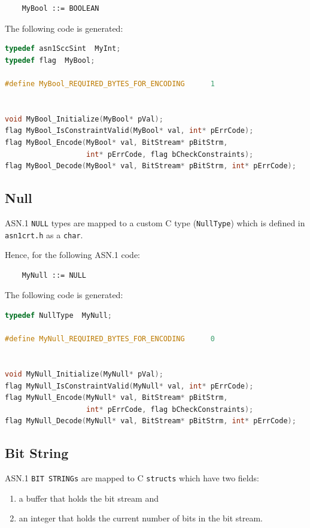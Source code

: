 \documentclass[11pt]{book}
\begin{document}
\begin{lstlisting}
	MyBool ::= BOOLEAN
\end{lstlisting}


      The following code is generated:

\begin{lstlisting}[language=c]
typedef asn1SccSint  MyInt;
typedef flag  MyBool;

#define MyBool_REQUIRED_BYTES_FOR_ENCODING		1


void MyBool_Initialize(MyBool* pVal);
flag MyBool_IsConstraintValid(MyBool* val, int* pErrCode);
flag MyBool_Encode(MyBool* val, BitStream* pBitStrm, 
                   int* pErrCode, flag bCheckConstraints);
flag MyBool_Decode(MyBool* val, BitStream* pBitStrm, int* pErrCode);
\end{lstlisting}


      \subsection{Null}
      ASN.1 \texttt{NULL} types are mapped to a custom C type (\texttt{NullType}) which is defined in 
      \texttt{asn1crt.h} as a \texttt{char}.

      Hence, for the following ASN.1 code:

\begin{lstlisting}
	MyNull ::= NULL
\end{lstlisting}

      The following code is generated:

\begin{lstlisting}[language=c]
typedef NullType  MyNull;

#define MyNull_REQUIRED_BYTES_FOR_ENCODING		0


void MyNull_Initialize(MyNull* pVal);
flag MyNull_IsConstraintValid(MyNull* val, int* pErrCode);
flag MyNull_Encode(MyNull* val, BitStream* pBitStrm, 
                   int* pErrCode, flag bCheckConstraints);
flag MyNull_Decode(MyNull* val, BitStream* pBitStrm, int* pErrCode);
\end{lstlisting}


      \subsection{Bit String}
      ASN.1 \texttt{BIT STRINGs} are mapped to C \texttt{structs} which have two fields: 
      \begin{enumerate}
         \item
            a buffer that holds the bit stream and
         \item
            an integer that holds the current number of bits in the bit stream.
      \end{enumerate}
\end{document}
